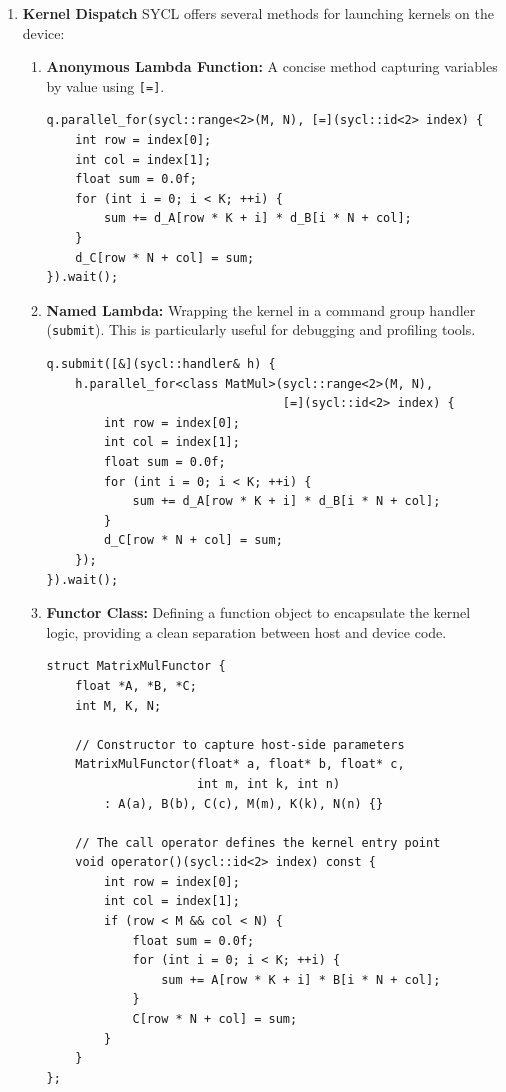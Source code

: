 \begin{enumerate}
\begin{lstlisting}
// Explicitly copy data to device memory
q.memcpy(d_A, h_A, sizeA);
q.memcpy(d_B, h_B, sizeB).wait(); // Ensure transfer is complete before proceeding
\end{lstlisting}

    \item \textbf{Kernel Dispatch}
    SYCL offers several methods for launching kernels on the device:
    \begin{enumerate}
        \item \textbf{Anonymous Lambda Function:} A concise method capturing variables by value using \lstinline{[=]}.
\begin{lstlisting}
q.parallel_for(sycl::range<2>(M, N), [=](sycl::id<2> index) {
    int row = index[0];
    int col = index[1];
    float sum = 0.0f;
    for (int i = 0; i < K; ++i) {
        sum += d_A[row * K + i] * d_B[i * N + col];
    }
    d_C[row * N + col] = sum;
}).wait();
\end{lstlisting}

        \item \textbf{Named Lambda:} Wrapping the kernel in a command group handler (\lstinline{submit}). This is particularly useful for debugging and profiling tools.
\begin{lstlisting}
q.submit([&](sycl::handler& h) {
    h.parallel_for<class MatMul>(sycl::range<2>(M, N),
                                 [=](sycl::id<2> index) {
        int row = index[0];
        int col = index[1];
        float sum = 0.0f;
        for (int i = 0; i < K; ++i) {
            sum += d_A[row * K + i] * d_B[i * N + col];
        }
        d_C[row * N + col] = sum;
    });
}).wait();
\end{lstlisting}

        \item \textbf{Functor Class:} Defining a function object to encapsulate the kernel logic, providing a clean separation between host and device code.
\begin{lstlisting}
struct MatrixMulFunctor {
    float *A, *B, *C;
    int M, K, N;

    // Constructor to capture host-side parameters
    MatrixMulFunctor(float* a, float* b, float* c,
                     int m, int k, int n)
        : A(a), B(b), C(c), M(m), K(k), N(n) {}

    // The call operator defines the kernel entry point
    void operator()(sycl::id<2> index) const {
        int row = index[0];
        int col = index[1];
        if (row < M && col < N) {
            float sum = 0.0f;
            for (int i = 0; i < K; ++i) {
                sum += A[row * K + i] * B[i * N + col];
            }
            C[row * N + col] = sum;
        }
    }
};


\end{lstlisting}
\end{enumerate}
\end{enumerate}
